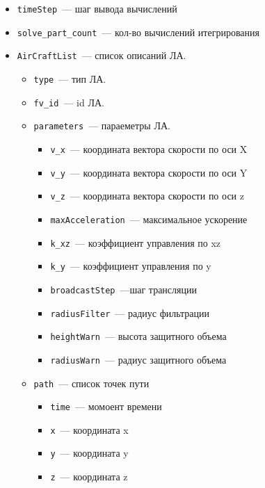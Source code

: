 \documentclass[a4paper,12pt]{article}
\begin{document}
\begin{itemize}
    \item \texttt{timeStep}~--- шаг вывода вычислений
    \item \texttt{solve\_part\_count}~--- кол-во вычислений итегрирования
    \item \texttt{AirCraftList}~--- список описаний ЛА.
    \begin{itemize}
        \item \texttt{type}~--- тип ЛА.
        \item \texttt{fv\_id}~---  id ЛА.
        \item \texttt{parameters}~--- параеметры ЛА.
        \begin{itemize}
            \item  \texttt{v\_x}~--- координата вектора скорости по оси X
            \item  \texttt{v\_y}~--- координата вектора скорости по оси Y
            \item  \texttt{v\_z}~--- координата вектора скорости по оси z
            \item \texttt{maxAcceleration}~--- максимальное ускорение
            \item\texttt{k\_xz}~--- коэффициент управления по xz
            \item\texttt{k\_y}~--- коэффициент управления по y
            \item\texttt{broadcastStep}~---шаг трансляции
            \item\texttt{radiusFilter}~--- радиус фильтрации
            \item\texttt{heightWarn}~--- высота защитного объема 
            \item\texttt{radiusWarn}~--- радиус защитного объема
        \end{itemize}
        \item \texttt{path}~--- список точек пути
        \begin{itemize}
            \item \texttt{time}~--- момоент времени
            \item \texttt{x}~--- координата x
            \item \texttt{y}~--- координата y
            \item\texttt{z}~--- координата z
        \end{itemize}
    \end{itemize}
\end{itemize}
\end{document}
